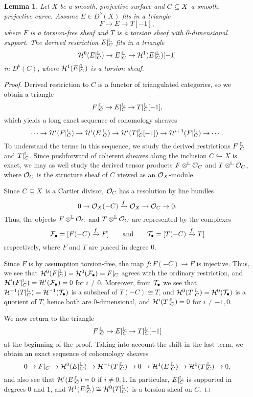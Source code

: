 \documentclass[letterpaper,11pt]{amsart}%
\newtheorem{lem}[thm]{Lemma}
\theoremstyle{remark}
\begin{document}
\begin{lem}\label{restsingle} 
    Let $X$ be a smooth, projective surface and $C \subseteq X$ a smooth, projective curve. Assume $E \in D^b(X)$ fits in a triangle
    \[ F \to E \to T[-1], \]
    where $F$ is a torsion-free sheaf and $T$ is a torsion sheaf with 0-dimensional support. The derived restriction $E|_C^{\mathbb{L}}$ fits in a triangle
    \[ \mathcal{H}^0(E|_C^{\mathbb{L}}) \to E|_C^{\mathbb{L}} \to \mathcal{H}^1(E|_C^{\mathbb{L}})[-1] \]
    in $D^b(C)$, where $\mathcal{H}^1(E|_C^{\mathbb{L}})$ is a torsion sheaf.
\end{lem}
\begin{proof}
Derived restriction to $C$ is a functor of triangulated categories, so we obtain a triangle
\[ F|_C^{\mathbb{L}} \to E|_C^{\mathbb{L}} \to T|_C^{\mathbb{L}}[-1], \]
which yields a long exact sequence of cohomology sheaves
\[ \cdots \to \mathcal{H}^i(F|_C^{\mathbb{L}}) \to \mathcal{H}^i(E|_C^{\mathbb{L}}) \to \mathcal{H}^i(T|_C^{\mathbb{L}}[-1]) \to \mathcal{H}^{i+1}(F|_C^{\mathbb{L}}) \to \cdots. \]
To understand the terms in this sequence, we study the derived restrictions $F|_C^{\mathbb{L}}$ and $T|_C^{\mathbb{L}}$. Since pushforward of coherent sheaves along the inclusion $C \hookrightarrow X$ is exact, we may as well study the derived tensor products $F \otimes^{\mathbb{L}} \mathcal{O}_C$ and $T \otimes^{\mathbb{L}} \mathcal{O}_C$, where $\mathcal{O}_C$ is the structure sheaf of $C$ viewed as an $\mathcal{O}_X$-module. 

Since $C \subseteq X$ is a Cartier divisor, $\mathcal{O}_C$ has a resolution by line bundles
\[ 0 \to \mathcal{O}_X(-C) \xrightarrow{f} \mathcal{O}_X \to \mathcal{O}_C \to 0. \]
Thus, the objects $F \otimes^{\mathbb{L}} \mathcal{O}_C$ and $T \otimes^{\mathbb{L}} \mathcal{O}_C$ are represented by the complexes
\[ \mathcal{F}_\bullet = [F(-C) \xrightarrow{f} F] \qquad \mathrm{and} \qquad \mathcal{T}_\bullet = [T(-C) \xrightarrow{f} T] \]
respectively, where $F$ and $T$ are placed in degree 0. 

Since $F$ is by assumption torsion-free, the map $f: F(-C) \to F$ is injective. Thus, we see that $\mathcal{H}^0(F|_C^{\mathbb{L}}) = \mathcal{H}^0(\mathcal{F}_\bullet) = F|_C$ agrees with the ordinary restriction, and $\mathcal{H}^i(F|_C^{\mathbb{L}}) = \mathcal{H}^i(\mathcal{F}_\bullet) = 0$ for $i \neq 0$. Moreover, from $\mathcal{T}_\bullet$ we see that $\mathcal{H}^{-1}(T|_C^{\mathbb{L}}) = \mathcal{H}^{-1}(\mathcal{T}_\bullet)$ is a subsheaf of $T(-C) \cong T$, and $\mathcal{H}^0(T|_C^{\mathbb{L}}) = \mathcal{H}^0(\mathcal{T}_\bullet)$ is a quotient of $T$, hence both are 0-dimensional, and $\mathcal{H}^i(T|_C^{\mathbb{L}}) = 0$ for $i \neq -1, 0$.

We now return to the triangle
\[ F|_C^{\mathbb{L}} \to E|_C^{\mathbb{L}} \to T|_C^{\mathbb{L}}[-1] \]
at the beginning of the proof. Taking into account the shift in the last term, we obtain an exact sequence of cohomology sheaves
\[ 0 \to F|_C \to \mathcal{H}^0(E|_C^{\mathbb{L}}) \to \mathcal{H}^{-1}(T|_C^{\mathbb{L}}) \to 0 \to \mathcal{H}^1(E|_C^{\mathbb{L}}) \to \mathcal{H}^0(T|_C^{\mathbb{L}}) \to 0, \]
and also see that $\mathcal{H}^i(E|_C^{\mathbb{L}}) = 0$ if $i \neq 0,1$. In particular, $E|_C^{\mathbb{L}}$ is supported in degrees $0$ and $1$, and $\mathcal{H}^1(E|_C^{\mathbb{L}}) \cong \mathcal{H}^0(T|_C^{\mathbb{L}})$ is a torsion sheaf on $C$.


\end{proof}
\end{document}
